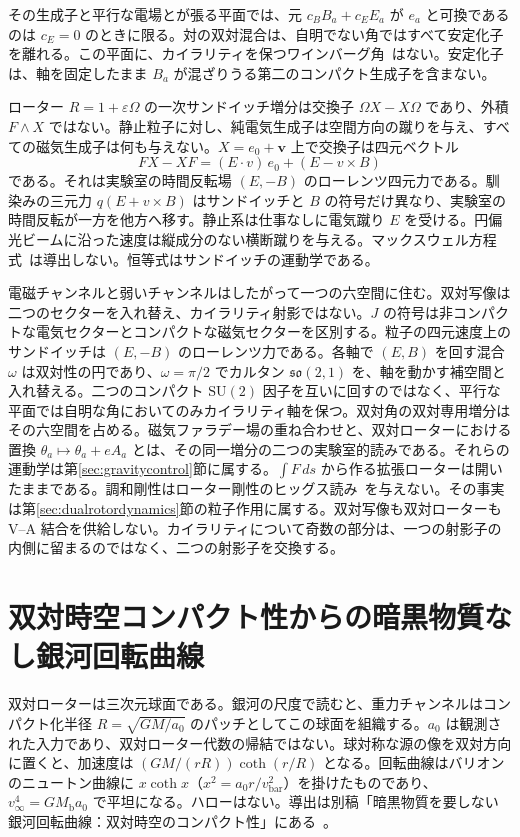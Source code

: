 \documentclass[a4paper]{article}
\begin{document}
その生成子と平行な電場とが張る平面では、元 $c_B B_a + c_E E_a$ が $e_a$ と可換であるのは $c_E=0$ のときに限る。対の双対混合は、自明でない角ではすべて安定化子を離れる。この平面に、カイラリティを保つワインバーグ角~\cite{weinberg1967}はない。安定化子は、軸を固定したまま $B_a$ が混ざりうる第二のコンパクト生成子を含まない。

ローター $R=1+\varepsilon\Omega$ の一次サンドイッチ増分は交換子 $\Omega X-X\Omega$ であり、外積 $F\wedge X$ ではない。静止粒子に対し、純電気生成子は空間方向の蹴りを与え、すべての磁気生成子は何も与えない。$X=e_0+\mathbf{v}$ 上で交換子は四元ベクトル
\begin{equation}
\label{eq:faraday-lorentz}
FX-XF=(E\cdot v)\,e_0+(E-v\times B)
\end{equation}
である。それは実験室の時間反転場 $(E,-B)$ のローレンツ四元力である。馴染みの三元力 $q(E+v\times B)$ はサンドイッチと $B$ の符号だけ異なり、実験室の時間反転が一方を他方へ移す。静止系は仕事なしに電気蹴り $E$ を受ける。円偏光ビームに沿った速度は縦成分のない横断蹴りを与える。マックスウェル方程式~\cite{maxwell1865}は導出しない。恒等式はサンドイッチの運動学である。

電磁チャンネルと弱いチャンネルはしたがって一つの六空間に住む。双対写像は二つのセクターを入れ替え、カイラリティ射影ではない。$J$ の符号は非コンパクトな電気セクターとコンパクトな磁気セクターを区別する。粒子の四元速度上のサンドイッチは $(E,-B)$ のローレンツ力である。各軸で $(E,B)$ を回す混合 $\omega$ は双対性の円であり、$\omega=\pi/2$ でカルタン $\mathfrak{so}(2,1)$ を、軸を動かす補空間と入れ替える。二つのコンパクト $\mathrm{SU}(2)$ 因子を互いに回すのではなく、平行な平面では自明な角においてのみカイラリティ軸を保つ。双対角の双対専用増分はその六空間を占める。磁気ファラデー場の重ね合わせと、双対ローターにおける置換 $\theta_a\mapsto\theta_a+e A_a$ とは、その同一増分の二つの実験室的読みである。それらの運動学は第\ref{sec:gravitycontrol}節に属する。$\int F\,ds$ から作る拡張ローターは開いたままである。調和剛性はローター剛性のヒッグス読み~\cite{higgs1964}を与えない。その事実は第\ref{sec:dualrotordynamics}節の粒子作用に属する。双対写像も双対ローターも V--A 結合を供給しない。カイラリティについて奇数の部分は、一つの射影子の内側に留まるのではなく、二つの射影子を交換する。

\section{双対時空コンパクト性からの暗黒物質なし銀河回転曲線}
\label{sec:darkmatter}

双対ローターは三次元球面である。銀河の尺度で読むと、重力チャンネルはコンパクト化半径 $R=\sqrt{GM/a_0}$ のパッチとしてこの球面を組織する。$a_0$ は観測された入力であり、双対ローター代数の帰結ではない。球対称な源の像を双対方向に置くと、加速度は $(GM/(rR))\coth(r/R)$ となる。回転曲線はバリオンのニュートン曲線に $x\coth x$（$x^2=a_0 r/v_{\mathrm{bar}}^2$）を掛けたものであり、$v_\infty^4=GM_{\mathrm{b}}a_0$ で平坦になる。ハローはない。導出は別稿「暗黒物質を要しない銀河回転曲線：双対時空のコンパクト性」にある~\cite{dst-galactic}。
\end{document}
